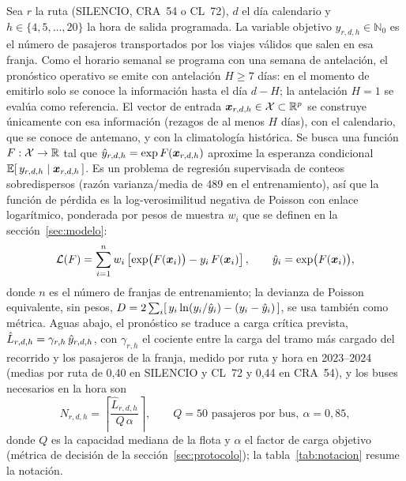 Sea $r$ la ruta (SILENCIO, CRA~54 o CL~72), $d$ el día calendario y $h \in \{4, 5, \dots, 20\}$ la hora de
salida programada. La variable objetivo $y_{r,d,h} \in \mathbb{N}_0$ es el número de pasajeros transportados
por los viajes válidos que salen en esa franja. Como el horario semanal se programa con una semana de
antelación, el pronóstico operativo se emite con antelación $H \geq 7$ días: en el momento de emitirlo solo
se conoce la información hasta el día $d - H$; la antelación $H = 1$ se evalúa como referencia. El vector de
entrada $\bm{x}_{r,d,h} \in \mathcal{X} \subset \mathbb{R}^{p}$ se construye únicamente con esa información (rezagos de al
menos $H$ días), con el calendario, que se conoce de antemano, y con la climatología histórica. Se busca una
función $F: \mathcal{X} \to \mathbb{R}$ tal que $\hat{y}_{r,d,h} = \exp F(\bm{x}_{r,d,h})$ aproxime la esperanza condicional
$\mathbb{E}[\,y_{r,d,h} \mid \bm{x}_{r,d,h}\,]$. Es un problema de regresión supervisada de conteos sobredispersos
(razón varianza/media de 489 en el entrenamiento), así que la función de pérdida es la log-verosimilitud
negativa de Poisson con enlace logarítmico, ponderada por pesos de muestra $w_i$ que se definen en la
sección~\ref{sec:modelo}:
\begin{equation}
  \mathcal{L}(F) = \sum_{i=1}^{n} w_i \left[ \exp\!\big(F(\bm{x}_i)\big) - y_i\, F(\bm{x}_i) \right],
  \qquad \hat{y}_i = \exp\!\big(F(\bm{x}_i)\big),
  \label{eq:poisson}
\end{equation}
donde $n$ es el número de franjas de entrenamiento; la devianza de Poisson equivalente, sin pesos,
$D = 2\sum_i [\,y_i \ln(y_i/\hat{y}_i) - (y_i - \hat{y}_i)\,]$, se usa también como métrica. Aguas abajo,
el pronóstico se traduce a carga crítica prevista, $\hat{L}_{r,d,h} = \gamma_{r,h}\, \hat{y}_{r,d,h}$, con
$\gamma_{r,h}$ el cociente entre la carga del tramo más cargado del recorrido y los pasajeros de la franja,
medido por ruta y hora en 2023--2024 (medias por ruta de 0,40 en SILENCIO y CL~72 y 0,44 en CRA~54), y los
buses necesarios en la hora son
\begin{equation}
  N_{r,d,h} = \left\lceil \frac{\hat{L}_{r,d,h}}{Q\,\alpha} \right\rceil,
  \qquad Q = 50 \text{ pasajeros por bus},\ \alpha = 0{,}85,
  \label{eq:buses}
\end{equation}
donde $Q$ es la capacidad mediana de la flota y $\alpha$ el factor de carga objetivo (métrica de decisión
de la sección~\ref{sec:protocolo}); la tabla~\ref{tab:notacion} resume la notación.

